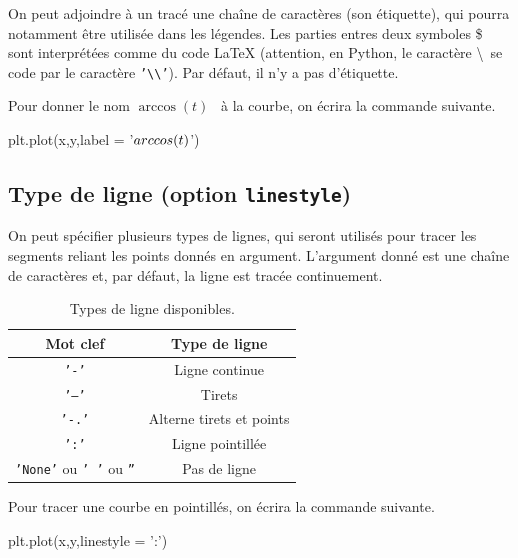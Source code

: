 On peut adjoindre à un tracé une chaîne de caractères (son étiquette), qui pourra notamment être utilisée dans les légendes. 
Les parties entres deux symboles \$ sont interprétées comme du code LaTeX  (attention, en Python, le caractère \textbackslash\ se code par le caractère \texttt{'\textbackslash\textbackslash'}). 
Par défaut, il n'y a pas d'étiquette.
\begin{exemple}
  Pour donner le nom \og $\arccos(t)$ \fg\ à la courbe, on écrira la commande suivante.
\begin{pyverbatim}
plt.plot(x,y,label = '$\\arccos(t)$')
\end{pyverbatim}
\end{exemple}
\subsection{Type de ligne (option \texttt{linestyle})}

On peut spécifier plusieurs types de lignes, qui seront utilisés pour tracer les segments reliant les points donnés en argument. 
L'argument donné est une chaîne de caractères et, par défaut, la ligne est tracée continuement. 

\begin{table}[!h]
  \begin{center}
    \begin{tabular}{|c|c|}
      \hline
      Mot clef & Type de ligne \\
      \hline
      \texttt{'-'} & Ligne continue \\
      \hline
      \texttt{'--'} & Tirets  \\
      \hline
      \texttt{'-.'} & Alterne tirets et points \\
      \hline
      \texttt{':'} & Ligne pointillée \\
      \hline
      \texttt{'None'} ou \texttt{' '} ou \texttt{''} & Pas de ligne \\
      \hline
    \end{tabular}
    \caption{Types de ligne disponibles.}
  \end{center}
\end{table}

\begin{exemple}
  Pour tracer une courbe en pointillés, on écrira la commande suivante.
\begin{pyverbatim}
plt.plot(x,y,linestyle = ':')
\end{pyverbatim}
\end{exemple}

